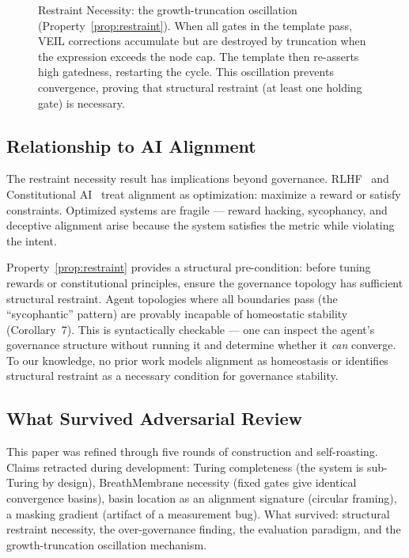 \documentclass[sigconf,nonacm]{acmart}
\begin{document}
\begin{figure}[t]
  \caption{Restraint Necessity: the growth-truncation oscillation
    (Property~\ref{prop:restraint}). When all gates in the template pass,
    VEIL corrections accumulate but are destroyed by truncation when the
    expression exceeds the node cap. The template then re-asserts high
    gatedness, restarting the cycle. This oscillation prevents convergence,
    proving that structural restraint (at least one holding gate) is
    necessary.}
  \label{fig:restraint}
\end{figure}


\subsection{Relationship to AI Alignment}\label{sec:alignment}

The restraint necessity result has implications beyond governance.
RLHF~\cite{christiano2017} and Constitutional AI~\cite{bai2022} treat
alignment as optimization: maximize a reward or satisfy constraints.
Optimized systems are fragile --- reward hacking, sycophancy, and
deceptive alignment arise because the system satisfies the metric while
violating the intent.

Property~\ref{prop:restraint} provides a structural pre-condition:
before tuning rewards or constitutional principles, ensure the
governance topology has sufficient structural restraint. Agent
topologies where all boundaries pass (the ``sycophantic'' pattern) are
provably incapable of homeostatic stability (Corollary~7). This is
syntactically checkable --- one can inspect the agent's governance
structure without running it and determine whether it \emph{can}
converge. To our knowledge, no prior work models alignment as
homeostasis or identifies structural restraint as a necessary condition
for governance stability.

\subsection{What Survived Adversarial Review}

This paper was refined through five rounds of construction and
self-roasting. Claims retracted during development: Turing completeness
(the system is sub-Turing by design), BreathMembrane necessity (fixed
gates give identical convergence basins), basin location as an alignment
signature (circular framing), a masking gradient (artifact of a
measurement bug). What survived: structural restraint necessity, the
over-governance finding, the evaluation paradigm, and the
growth-truncation oscillation mechanism.
\end{document}
